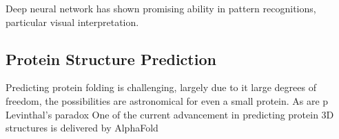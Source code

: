 Deep neural network has shown promising ability in pattern recognitions, particular visual interpretation.
\par 

\subsection{Protein Structure Prediction}
Predicting protein folding is challenging, largely due to it large degrees of freedom, the possibilities are astronomical for even a small protein. As  are p Levinthal's paradox One of the current advancement in predicting protein 3D structures is delivered by AlphaFold